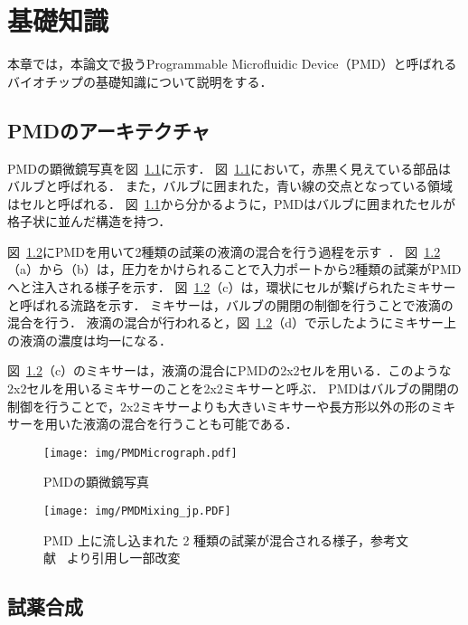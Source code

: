 \chapter{基礎知識}
本章では，本論文で扱うProgrammable Microfluidic Device（PMD）と呼ばれるバイオチップの基礎知識について説明をする．

\section{PMDのアーキテクチャ}
PMDの顕微鏡写真を図~\ref{fig:PMDMicrograph}に示す．
図~\ref{fig:PMDMicrograph}において，赤黒く見えている部品はバルブと呼ばれる．
また，バルブに囲まれた，青い線の交点となっている領域はセルと呼ばれる．
図~\ref{fig:PMDMicrograph}から分かるように，PMDはバルブに囲まれたセルが格子状に並んだ構造を持つ．

図~\ref{fig:MixingOnPMD}にPMDを用いて2種類の試薬の液滴の混合を行う過程を示す~\cite{4}．
図~\ref{fig:MixingOnPMD}（a）から（b）は，圧力をかけられることで入力ポートから2種類の試薬がPMDへと注入される様子を示す．
図~\ref{fig:MixingOnPMD}（c）は，環状にセルが繋げられたミキサーと呼ばれる流路を示す．
ミキサーは，バルブの開閉の制御を行うことで液滴の混合を行う．
液滴の混合が行われると，図~\ref{fig:MixingOnPMD}（d）で示したようにミキサー上の液滴の濃度は均一になる．

図~\ref{fig:MixingOnPMD}（c）のミキサーは，液滴の混合にPMDの2x2セルを用いる．このような2x2セルを用いるミキサーのことを2x2ミキサーと呼ぶ．
PMDはバルブの開閉の制御を行うことで，2x2ミキサーよりも大きいミキサーや長方形以外の形のミキサーを用いた液滴の混合を行うことも可能である．

\begin{figure}[tbp]
 \centering\texttt{[image: img/PMDMicrograph.pdf]}
 \caption{PMDの顕微鏡写真}\label{fig:PMDMicrograph}
\end{figure}

\begin{figure}[tbp]
    \centering\texttt{[image: img/PMDMixing\_jp.PDF]}
    \caption{PMD 上に流し込まれた 2 種類の試薬が混合される様子，参考文献~\cite{4} より引用し一部改変}\label{fig:MixingOnPMD}
\end{figure}

\section{試薬合成}

